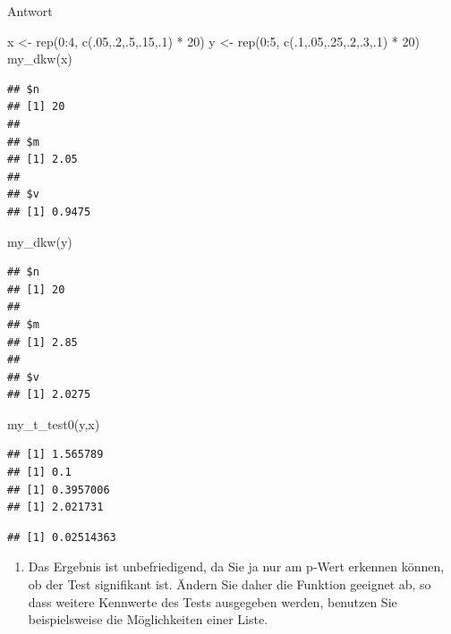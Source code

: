 \documentclass[
]{book}
\newenvironment{Shaded}{\begin{snugshade}}{\end{snugshade}}
\newcommand{\DecValTok}[1]{\textcolor[rgb]{0.00,0.00,0.81}{#1}}
\newcommand{\FunctionTok}[1]{\textcolor[rgb]{0.00,0.00,0.00}{#1}}
\newcommand{\NormalTok}[1]{#1}
\newcommand{\OtherTok}[1]{\textcolor[rgb]{0.56,0.35,0.01}{#1}}
\newcommand{\SpecialCharTok}[1]{\textcolor[rgb]{0.00,0.00,0.00}{#1}}
\providecommand{\tightlist}{%
  \setlength{\itemsep}{0pt}\setlength{\parskip}{0pt}}
\begin{document}
Antwort

\begin{Shaded}
\begin{Highlighting}[]
\NormalTok{x }\OtherTok{\textless{}{-}} \FunctionTok{rep}\NormalTok{(}\DecValTok{0}\SpecialCharTok{:}\DecValTok{4}\NormalTok{, }\FunctionTok{c}\NormalTok{(.}\DecValTok{05}\NormalTok{,.}\DecValTok{2}\NormalTok{,.}\DecValTok{5}\NormalTok{,.}\DecValTok{15}\NormalTok{,.}\DecValTok{1}\NormalTok{) }\SpecialCharTok{*} \DecValTok{20}\NormalTok{)}
\NormalTok{y }\OtherTok{\textless{}{-}} \FunctionTok{rep}\NormalTok{(}\DecValTok{0}\SpecialCharTok{:}\DecValTok{5}\NormalTok{, }\FunctionTok{c}\NormalTok{(.}\DecValTok{1}\NormalTok{,.}\DecValTok{05}\NormalTok{,.}\DecValTok{25}\NormalTok{,.}\DecValTok{2}\NormalTok{,.}\DecValTok{3}\NormalTok{,.}\DecValTok{1}\NormalTok{) }\SpecialCharTok{*} \DecValTok{20}\NormalTok{)}
\FunctionTok{my\_dkw}\NormalTok{(x)}
\end{Highlighting}
\end{Shaded}

\begin{verbatim}
## $n
## [1] 20
## 
## $m
## [1] 2.05
## 
## $v
## [1] 0.9475
\end{verbatim}

\begin{Shaded}
\begin{Highlighting}[]
\FunctionTok{my\_dkw}\NormalTok{(y)}
\end{Highlighting}
\end{Shaded}

\begin{verbatim}
## $n
## [1] 20
## 
## $m
## [1] 2.85
## 
## $v
## [1] 2.0275
\end{verbatim}

\begin{Shaded}
\begin{Highlighting}[]
\FunctionTok{my\_t\_test0}\NormalTok{(y,x)}
\end{Highlighting}
\end{Shaded}

\begin{verbatim}
## [1] 1.565789
## [1] 0.1
## [1] 0.3957006
## [1] 2.021731
\end{verbatim}

\begin{verbatim}
## [1] 0.02514363
\end{verbatim}

\begin{enumerate}
\def\labelenumi{(\arabic{enumi})}
\setcounter{enumi}{2}
\tightlist
\item
  Das Ergebnis ist unbefriedigend, da Sie ja nur am p-Wert erkennen können, ob der Test signifikant ist. Ändern Sie daher die Funktion geeignet ab, so dass weitere Kennwerte des Tests ausgegeben werden, benutzen Sie beispielsweise die Möglichkeiten einer Liste.
\end{enumerate}
\end{document}
